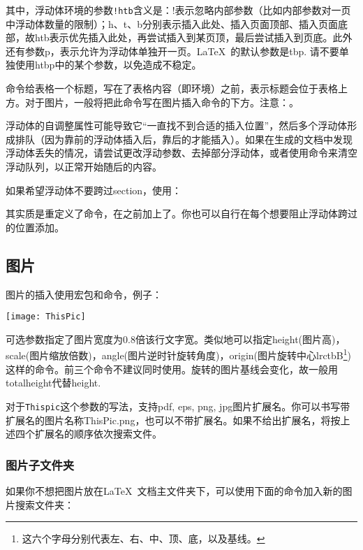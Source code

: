 其中，浮动体环境的参数\verb|!htb|含义是：!表示忽略内部参数（比如内部参数对一页中浮动体数量的限制）；h、t、b分别表示插入此处、插入页面顶部、插入页面底部，故htb表示优先插入此处，再尝试插入到某页顶，最后尝试插入到页底。此外还有参数p，表示允许为浮动体单独开一页。\LaTeX\ 的默认参数是tbp. 请不要单独使用htbp中的某个参数，以免造成不稳定。

命令给表格一个标题，写在了表格内容（即环境）之前，表示标题会位于表格上方。对于图片，一般将把此命令写在图片插入命令的下方。注意：。\dpar

浮动体的自调整属性可能导致它“一直找不到合适的插入位置”，然后多个浮动体形成排队（因为靠前的浮动体插入后，靠后的才能插入）。如果在生成的文档中发现浮动体丢失的情况，请尝试更改浮动参数、去掉部分浮动体，或者使用命令来清空浮动队列，以正常开始随后的内容。

如果希望浮动体不要跨过section，使用：
\begin{latex}
\usepackage[section]{placeins}
\end{latex}

其实质是重定义了命令，在之前加上了。你也可以自行在每个想要阻止浮动体跨过的位置添加。

\subsection{图片}
图片的插入使用宏包和命令，例子：
\begin{latex}
\begin{center}
    \texttt{[image: ThisPic]}
\end{center}
\end{latex}

可选参数指定了图片宽度为0.8倍该行文字宽。类似地可以指定height(图片高)，scale(图片缩放倍数)，angle(图片逆时针旋转角度)，origin(图片旋转中心lrctbB\footnote{这六个字母分别代表左、右、中、顶、底，以及基线。})这样的命令。前三个命令不建议同时使用。旋转的图片基线会变化，故一般用totalheight代替height. 

对于\texttt{Thispic}这个参数的写法，\xelatex 支持pdf, eps, png, jpg图片扩展名。你可以书写带扩展名的图片名称ThisPic.png，也可以不带扩展名。如果不给出扩展名，将按上述四个扩展名的顺序依次搜索文件。\dpar

\subsubsection{图片子文件夹}
如果你不想把图片放在\LaTeX\ 文档主文件夹下，可以使用下面的命令加入新的图片搜索文件夹：
\begin{latex}
\graphicspath{{c:/pics/}{./pic/}}
\end{latex}

